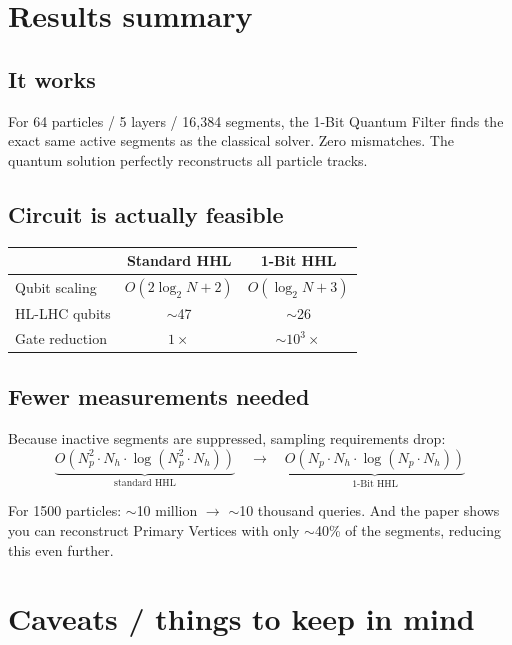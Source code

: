 \documentclass[11pt, a4paper]{article}
\begin{document}
\newpage
\section{Results summary}

\subsection{It works}

For 64 particles / 5 layers / 16,384 segments, the 1-Bit Quantum Filter
finds the exact same active segments as the classical solver. Zero
mismatches. The quantum solution perfectly reconstructs all particle tracks.

\subsection{Circuit is actually feasible}

\begin{center}
\begin{tabular}{lcc}
\toprule
& Standard HHL & 1-Bit HHL \\
\midrule
Qubit scaling & $O(2\log_2 N + 2)$ & $O(\log_2 N + 3)$ \\
HL-LHC qubits & $\sim$47 & $\sim$26 \\
Gate reduction & $1\times$ & $\sim 10^3\times$ \\
\bottomrule
\end{tabular}
\end{center}

\subsection{Fewer measurements needed}

Because inactive segments are suppressed, sampling requirements drop:
\[
  \underbrace{O(N_p^2 \cdot N_h \cdot \log(N_p^2 \cdot N_h))}_{\text{standard HHL}}
  \quad\to\quad
  \underbrace{O(N_p \cdot N_h \cdot \log(N_p \cdot N_h))}_{\text{1-Bit HHL}}
\]

For 1500 particles: $\sim$10 million $\to$ $\sim$10 thousand queries. And
the paper shows you can reconstruct Primary Vertices with only $\sim$40\%
of the segments, reducing this even further.

\section{Caveats / things to keep in mind}
\end{document}
